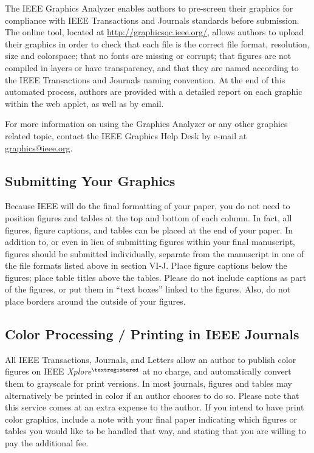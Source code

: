 \documentclass[journal]{IEEEtai}
\begin{document}
The IEEE Graphics Analyzer enables authors to pre-screen their graphics for compliance with IEEE Transactions and Journals standards before submission. The online tool, located at \underline{http://graphicsqc.ieee.org/}, allows authors to upload their graphics in order to check that each file is the correct file format, resolution, size and colorspace; that no fonts are missing or corrupt; that figures are not compiled in layers or have transparency, and that they are named according to the IEEE Transactions and Journals naming convention. At the end of this automated process, authors are provided with a detailed report on each graphic within the web applet, as well as by email.

For more information on using the Graphics Analyzer or any other graphics related topic, contact the IEEE Graphics Help Desk by e-mail at \underline{graphics@ieee.org}.

\subsection{Submitting Your Graphics}

Because IEEE will do the final formatting of your paper, you do not need to position figures and tables at the top and bottom of each column. In fact, all figures, figure captions, and tables can be placed at the end of your paper. In addition to, or even in lieu of submitting figures within your final manuscript, figures should be submitted individually, separate from the manuscript in one of the file formats listed above in section VI-J. Place figure captions below the figures; place table titles above the tables. Please do not include captions as part of the figures, or put them in ``text boxes'' linked to the figures. Also, do not place borders around the outside of your figures.


\subsection{Color Processing / Printing in IEEE Journals}

All IEEE Transactions, Journals, and Letters allow an author to publish color figures on IEEE {\it Xplore}$^{\scriptsize\textregistered}$ at no charge, and automatically convert them to grayscale for print versions. In most journals, figures and tables may alternatively be printed in color if an author chooses to do so. Please note that this service comes at an extra expense to the author. If you intend to have print color graphics, include a note with your final paper indicating which figures or tables you would like to be handled that way, and stating that you are willing to pay the additional fee.
\end{document}
